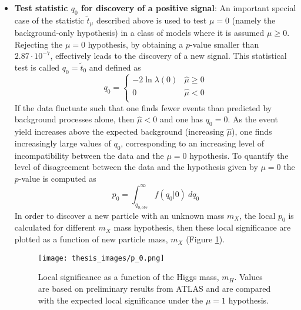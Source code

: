\documentclass[a4paper, oneside, 11pt, openright]{book}
\begin{document}
\begin{itemize}
 				\item  \textbf{Test statistic $q_0$ for discovery of a positive signal}: An important special case of the statistic $\tilde{t}_\mu$ described above is used to test $\mu = 0$ (namely the background-only hypothesis) in a class of models where it is assumed $\mu \geq 0$. Rejecting the $\mu=0$ hypothesis, by obtaining a $p$-value smaller than $2.87\cdot10^{-7}$, effectively leads to the discovery of a new signal. This statistical test is called $q_0=\tilde{t}_0$ and defined as
 				\begin{equation}\label{eq:q_0}
 					q_0 = 
 					\begin{cases}
 						-2\ln\lambda(0) & \hat{\mu}\geq0 \\
 						0 & \hat{\mu}<0 \\
 					\end{cases}
 				\end{equation}
 				If the data fluctuate such that one finds fewer events than predicted by background processes alone, then $\hat{\mu}<0$ and one has $q_0 = 0$. As the event yield increases above the expected background (increasing $\hat{\mu}$), one finds increasingly large values of $q_0$, corresponding to an increasing level of incompatibility between the data and the $\mu=0$ hypothesis. To quantify the level of disagreement between the data and the hypothesis given by $\mu=0$ the $p$-value is computed as
 				\begin{equation}\label{eq:p_0}
 					p_0 = \int_{q_{0,obs}}^{\infty} f(q_0|0)\ dq_0
 				\end{equation}
 				In order to discover a new particle with an unknown mass $m_X$, the local $p_0$ is calculated for different $m_X$ mass hypothesis, then these local significance are plotted as a function of new particle mass, $m_X$ (Figure \ref{fig:p_0}).
 				\begin{figure}
 					\centering
 					\texttt{[image: thesis\_images/p\_0.png]}			
 					\caption{Local significance as a function of the Higgs mass, $m_H$. Values are based on preliminary results from ATLAS and are compared with the expected local significance under the $\mu=1$ hypothesis.}
 					\label{fig:p_0}
 				\end{figure}
 			

\end{itemize}
\end{document}
